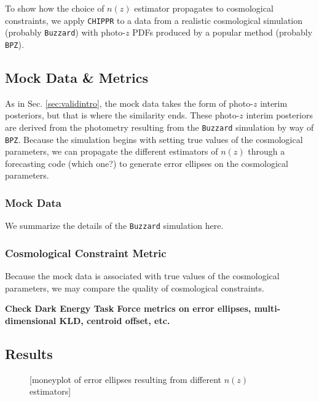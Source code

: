 \documentclass[iop]{emulateapj}
\newcommand{\chippr}{\texttt{CHIPPR} }
\begin{document}
To show how the choice of $n(z)$ estimator propagates to cosmological 
constraints, we apply \chippr to a data from a realistic cosmological 
simulation (probably \texttt{Buzzard}) with photo-$z$ PDFs produced by a 
popular method (probably \texttt{BPZ}).

\subsection{Mock Data \& Metrics}
\label{sec:appintro}

As in Sec. \ref{sec:validintro}, the mock data takes the form of photo-$z$ 
interim posteriors, but that is where the similarity ends.  These photo-$z$ 
interim posteriors are derived from the photometry resulting from the 
\texttt{Buzzard} simulation by way of \texttt{BPZ}.  Because the simulation 
begins with setting true values of the cosmological parameters, we can 
propagate the different estimators of $n(z)$ through a forecasting code (which 
one?) to generate error ellipses on the cosmological parameters.

\subsubsection{Mock Data}
\label{sec:buzzard}

We summarize the details of the \texttt{Buzzard} simulation here.

\subsubsection{Cosmological Constraint Metric}
\label{sec:cosmo}

Because the mock data is associated with true values of the cosmological 
parameters, we may compare the quality of cosmological constraints.

\textbf{Check Dark Energy Task Force metrics on error ellipses, 
multi-dimensional KLD, centroid offset, etc.}

\subsection{Results}
\label{sec:results}

\begin{figure}
	\begin{center}
		\caption{[moneyplot of error ellipses resulting from different 
$n(z)$ estimators]}
		\label{fig:money}
	\end{center}
\end{figure}
\end{document}
